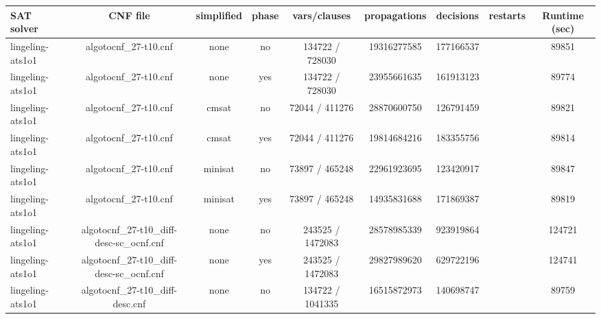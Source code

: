 \begin{appendices}
\begin{table}[p]
  \begin{center}
    \begin{tabular}{l|cccccccc}
        \textbf{SAT solver} & \textbf{CNF file} & \textbf{simplified} & \textbf{phase} & \textbf{vars/clauses} & \textbf{propagations} & \textbf{decisions} & \textbf{restarts} & \textbf{Runtime (sec)} \\
      \hline
  lingeling-ats1o1               & algotocnf\_27-t10.cnf          & none       & no    & 134722 / 728030 & 19316277585 & 177166537 &            & 89851 \\ %
  lingeling-ats1o1               & algotocnf\_27-t10.cnf          & none       & yes   & 134722 / 728030 & 23955661635 & 161913123 &            & 89774 \\ %
  lingeling-ats1o1               & algotocnf\_27-t10.cnf          & cmsat      & no    & 72044 / 411276 & 28870600750 & 126791459 &            & 89821 \\ %
  lingeling-ats1o1               & algotocnf\_27-t10.cnf          & cmsat      & yes   & 72044 / 411276 & 19814684216 & 183355756 &            & 89814 \\ %
  lingeling-ats1o1               & algotocnf\_27-t10.cnf          & minisat    & no    & 73897 / 465248 & 22961923695 & 123420917 &            & 89847 \\ %
  lingeling-ats1o1               & algotocnf\_27-t10.cnf          & minisat    & yes   & 73897 / 465248 & 14935831688 & 171869387 &            & 89819 \\ %
  lingeling-ats1o1               & algotocnf\_27-t10\_diff-desc-sc\_ocnf.cnf & none       & no    & 243525 / 1472083 & 28578985339 & 923919864 &            & 124721 \\ %
  lingeling-ats1o1               & algotocnf\_27-t10\_diff-desc-sc\_ocnf.cnf & none       & yes   & 243525 / 1472083 & 29827989620 & 629722196 &            & 124741 \\ %
  lingeling-ats1o1               & algotocnf\_27-t10\_diff-desc.cnf & none       & no    & 134722 / 1041335 & 16515872973 & 140698747 &            & 89759 \\ %

\end{tabular}
\end{center}
\end{table}
\end{appendices}

